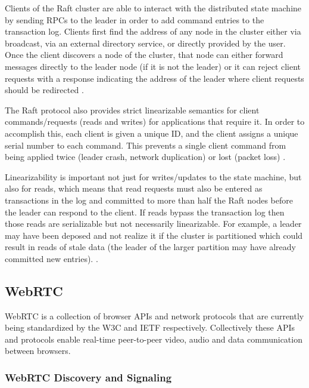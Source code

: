 \documentclass[conference,compsoc]{./IEEEtran/IEEEtran}
\begin{document}
Clients of the Raft cluster are able to interact with the distributed
state machine by sending RPCs to the leader in order to add command
entries to the transaction log. Clients first find the address of any
node in the cluster either via broadcast, via an external directory
service, or directly provided by the user. Once the client discovers
a node of the cluster, that node can either forward messages directly
to the leader node (if it is not the leader) or it can reject client
requests with a response indicating the address of the leader where
client requests should be redirected
\cite[Section~6.2]{raft_thesis:ongaro14}.

The Raft protocol also provides strict linearizable semantics for
client commands/requests (reads and writes) for applications that
require it.
In order to accomplish this, each client is given a unique ID, and the
client assigns a unique serial number to each command.  This prevents
a single client command from being applied twice (leader crash,
network duplication) or lost (packet loss)
\cite[Section~6.3]{raft_thesis:ongaro14}.

Linearizability is important not just for writes/updates to the state
machine, but also for reads, which means that read requests must also
be entered as transactions in the log and committed to more than half
the Raft nodes before the leader can respond to the client. If reads
bypass the transaction log then those reads are serializable but not
necessarily linearizable. For example, a leader may have been deposed
and not realize it if the cluster is partitioned which could result in
reads of stale data (the leader of the larger partition may have
already committed new entries).
\cite[Section~6.4]{raft_thesis:ongaro14}.

\subsection{WebRTC}

WebRTC is a collection of browser APIs \cite{webrtc:feb2015} and
network protocols \cite{draft-rtcweb-overview} that are currently
being standardized by the W3C and IETF respectively. Collectively
these APIs and protocols enable real-time peer-to-peer video, audio
and data communication between browsers.

\subsubsection{WebRTC Discovery and Signaling}
\end{document}
